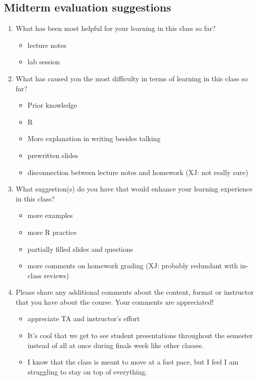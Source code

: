 \subsection*{Midterm evaluation suggestions}
\begin{enumerate}
	\item What has been most helpful for your learning in this class so far?
	    \begin{itemize}
	    	\item lecture notes
	    	\item lab session
	    \end{itemize}
    \item What has caused you the most difficulty in terms of learning in this class so far?
        \begin{itemize}
        	\item Prior knowledge 
        	\item R
        	\item More explanation in writing besides talking
        	\item prewritten slides
        	\item disconnection between lecture notes and homework (XJ: not really sure)
        \end{itemize}        	
   \item What suggestion(s) do you have that would enhance your learning experience in this class?
       \begin{itemize}
       	\item more examples
       	\item more R practice
       	\item partially filled slides and questions
       	\item more comments on homework grading (XJ: probably redundant with in-class reviews)
       \end{itemize}
   \item  Please share any additional comments about the content, format or instructor that you have about the course. Your comments are appreciated!
       \begin{itemize}
       	\item appreciate TA and instructor's effort
       	\item It's cool that we get to see student presentations throughout the semester instead of all at once during finals week like other classes.
       	\item I know that the class is meant to move at a fast pace, but I feel I am struggling to stay on top of everything.
       \end{itemize}
\end{enumerate}

